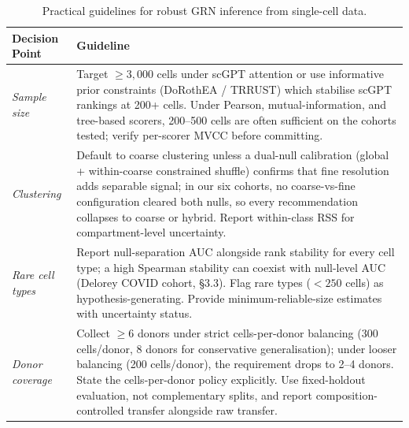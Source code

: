 \documentclass[12pt]{article}
\providecommand{\DIFaddbegin}{} %
\providecommand{\DIFdelend}{} %
\begin{document}
\DIFdelend \DIFaddbegin \begin{table}[ht]
\centering
\caption{Practical guidelines for robust GRN inference from single-cell data.}
\label{tab:guidelines}
\small
\begin{tabularx}{\textwidth}{lX}
\toprule
\textbf{Decision Point} & \textbf{Guideline} \\
\midrule
\textit{Sample size} &
  Target $\geq 3{,}000$ cells under scGPT attention or use informative
  prior constraints (DoRothEA / TRRUST) which stabilise scGPT rankings
  at 200+ cells. Under Pearson, mutual-information, and tree-based
  scorers, 200--500 cells are often sufficient on the cohorts tested;
  verify per-scorer MVCC before committing. \\
\addlinespace
\textit{Clustering} &
  Default to coarse clustering unless a dual-null calibration (global +
  within-coarse constrained shuffle) confirms that fine resolution
  adds separable signal; in our six cohorts, no coarse-vs-fine
  configuration cleared both nulls, so every recommendation collapses
  to coarse or hybrid. Report within-class RSS for compartment-level
  uncertainty. \\
\addlinespace
\textit{Rare cell types} &
  Report null-separation AUC alongside rank stability for every cell
  type; a high Spearman stability can coexist with null-level AUC
  (Delorey COVID cohort, §3.3). Flag rare types ($< 250$ cells) as
  hypothesis-generating. Provide minimum-reliable-size estimates with
  uncertainty status. \\
\addlinespace
\textit{Donor coverage} &
  Collect $\geq 6$ donors under strict cells-per-donor balancing
  (300 cells/donor, 8 donors for conservative generalisation); under
  looser balancing (200 cells/donor), the requirement drops to 2--4
  donors. State the cells-per-donor policy explicitly. Use
  fixed-holdout evaluation, not complementary splits, and report
  composition-controlled transfer alongside raw transfer. \\

\end{tabularx}
\end{table}
\end{document}
